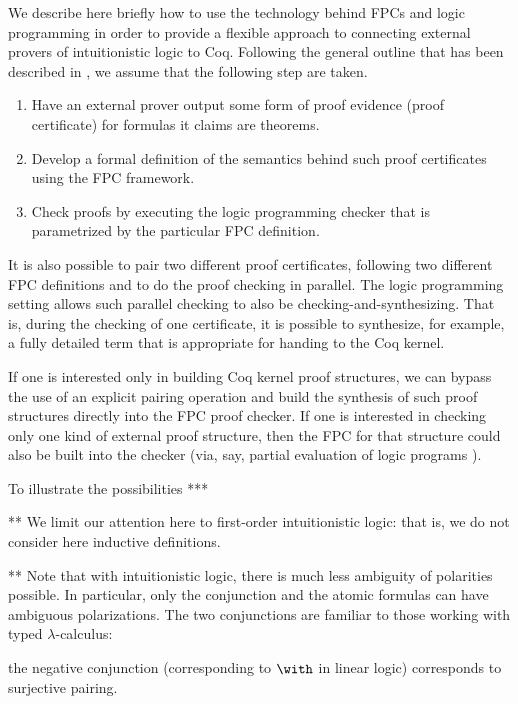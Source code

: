 We describe here briefly how to use the technology behind FPCs and
logic programming in order to provide a flexible approach to
connecting external provers of intuitionistic logic to Coq.
%
Following the general outline that has been described in
\cite{blanco17cade}, we assume that the following step are taken.
%
\begin{enumerate}
\item Have an external prover output some form of proof evidence
  (proof certificate) for formulas it claims are theorems.

\item Develop a formal definition of the semantics behind such proof
  certificates using the FPC framework.

\item Check proofs by executing the logic programming checker that is
  parametrized by the particular FPC definition.
\end{enumerate}
%
It is also possible to pair two different proof certificates,
following two different FPC definitions and to do the proof checking
in parallel.  The logic programming setting allows such parallel
checking to also be checking-and-synthesizing.  That is, during the
checking of one certificate, it is possible to synthesize, for
example, a fully detailed term that is appropriate for handing to the
Coq kernel.

If one is interested only in building Coq kernel proof structures, we
can bypass the use of an explicit pairing operation and build the
synthesis of such proof structures directly into the FPC proof
checker.  If one is interested in checking only one kind of external
proof structure, then the FPC for that structure could also be built
into the checker (via, say, partial evaluation of logic programs
\cite{lloyd91jlp}).

To illustrate the possibilities ***



** We limit our attention here to first-order intuitionistic logic:
that is, we do not consider here inductive definitions.

** Note that with intuitionistic logic, there is much less ambiguity
of polarities possible.  In particular, only the conjunction and the
atomic formulas can have ambiguous polarizations.  The two
conjunctions are familiar to those working with typed
$\lambda$-calculus: 

the negative conjunction (corresponding to $\with$ in linear logic)
corresponds to surjective pairing.

